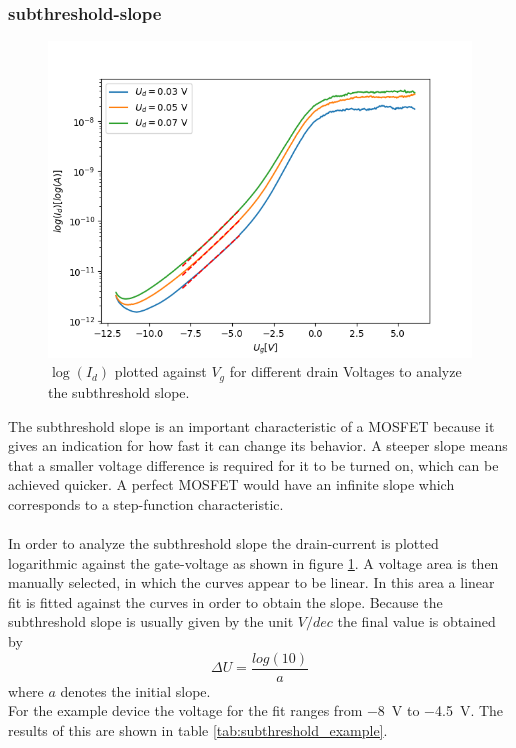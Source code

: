 \documentclass[%
 reprint,
amsmath,amssymb,
pra,
]{revtex4-1}
\begin{document}
\subsubsection{subthreshold-slope}

\begin{figure}
\centering
\includegraphics[scale=0.6]{Bilder/log.png}
\caption{$\log(I_d)$ plotted against $V_g$ for different drain Voltages to analyze the subthreshold slope.}
\label{fig:log}
\end{figure}

The subthreshold slope is an important characteristic of a MOSFET because it gives an indication for how fast it can change its behavior. A steeper slope means that a smaller voltage difference is required for it to be turned on, which can be achieved quicker. A perfect MOSFET would have an infinite slope which corresponds to a step-function characteristic.\\
\\
In order to analyze the subthreshold slope the drain-current is plotted logarithmic against the gate-voltage as shown in figure \ref{fig:log}. A voltage area is then manually  selected, in which the curves appear to be linear. In this area a linear fit is fitted against the curves in order to obtain the slope. Because the subthreshold slope is usually given by the unit $\si{V/dec}$ the final value is obtained by
\begin{equation}
\Delta U = \dfrac{log(10)}{a}
\end{equation}
where $a$ denotes the initial slope.\\
For the example device the voltage for the fit ranges from \SI{-8}{V} to \SI{-4.5}{V}. The results of this are shown in table \ref{tab:subthreshold_example}.
\end{document}
